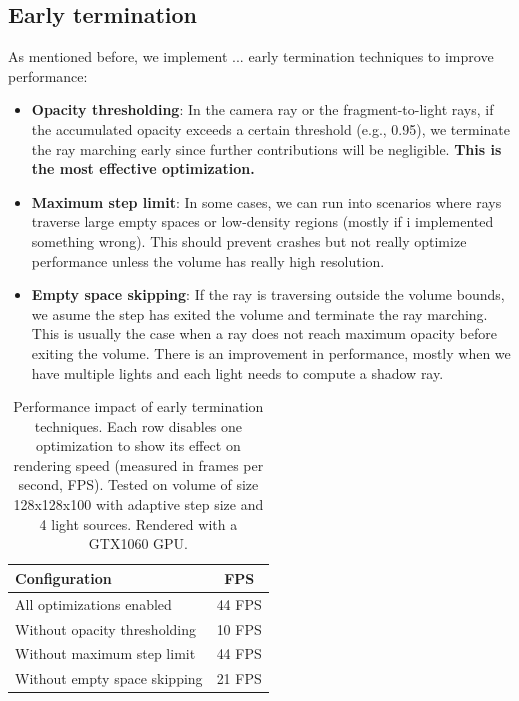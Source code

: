 \documentclass[10pt,a4paper,twoside]{tau-book}
\begin{document}
\subsection{Early termination}
As mentioned before, we implement ... early termination techniques to improve performance:
\begin{itemize}
    \item \textbf{Opacity thresholding}: In the camera ray or the fragment-to-light rays, if the accumulated opacity exceeds a certain threshold (e.g., 0.95), we terminate the ray marching early since further contributions will be negligible. \textbf{This is the most effective optimization.}
    \item \textbf{Maximum step limit}: In some cases, we can run into scenarios where rays traverse large empty spaces or low-density regions (mostly if i implemented something wrong). This should prevent crashes but not really optimize performance unless the volume has really high resolution. 
    \item \textbf{Empty space skipping}: If the ray is traversing outside the volume bounds, we asume the step has exited the volume and terminate the ray marching. This is usually the case when a ray does not reach maximum opacity before exiting the volume. There is an improvement in performance, mostly when we have multiple lights and each light needs to compute a shadow ray. 
\end{itemize}

\begin{table}[htbp]
    \centering
    \caption{Performance impact of early termination techniques. Each row disables one optimization to show its effect on rendering speed (measured in frames per second, FPS). Tested on volume of size 128x128x100 with adaptive step size and 4 light sources. Rendered with a GTX1060 GPU.}
    \begin{tabular}{l c}
        \hline
        \textbf{Configuration} & \textbf{FPS} \\
        \hline
        All optimizations enabled & 44 FPS \\
        Without opacity thresholding & 10 FPS \\
        Without maximum step limit & 44 FPS \\
        Without empty space skipping & 21 FPS \\
        \hline
    \end{tabular}
    \label{tab:early-termination}
\end{table}
\end{document}
